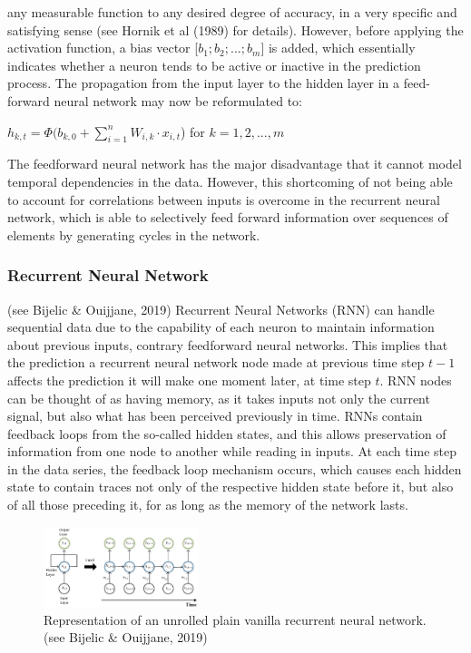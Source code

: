 \documentclass[a4paper,11pt,oneside]{book}
\begin{document}
any measurable function to any desired degree
of accuracy, in a very specific and satisfying
sense (see Hornik et al (1989) for details). However, before applying
the activation function, a bias vector [$b_{1};b_{2};...;b_{m}$] is added, which essentially
indicates whether a neuron tends to be active or inactive in the prediction process. The
propagation from the input layer to the hidden layer in a feed-forward neural
network may now be reformulated to:
 \begin{center}
	$h_{k,t} =\Phi(b_{k,0} +\sum_{i=1}^{n} W_{i,k} \cdot x_{i,t}$) for $k = 1,2,...,m$
\end{center}
The feedforward neural network has the major disadvantage that it cannot model temporal dependencies in the data. However, this shortcoming of not being able to account for correlations between inputs is overcome in the recurrent neural network, which is able to selectively feed forward information over sequences of elements by generating cycles in the network.
\subsubsection{Recurrent Neural Network} (see Bijelic \& Ouijjane, 2019)
Recurrent Neural Networks
(RNN) can handle sequential data due to the capability of each neuron to
maintain information about previous inputs, contrary feedforward neural networks. This implies that the prediction a recurrent
neural network node made at previous time step $t-1$ affects the prediction it will make one
moment later, at time step $t$. RNN nodes can be thought of as having memory, as it takes inputs not only the current signal, but also
what has been perceived previously in time.\newline\newline
RNNs contain feedback loops from the so-called hidden states, and this allows preservation of information from one node to another while reading in inputs. At each time step in the data series, the feedback loop mechanism occurs, which causes each hidden state to contain traces not only of the respective hidden state before it, but also of all those preceding it, for as long as the memory of the network lasts.\newline
\begin{figure}[h]
	\centering
	\includegraphics[width=0.4\textwidth]{figures/RNN}
	\caption{Representation of an unrolled plain vanilla recurrent neural network. (see Bijelic \& Ouijjane, 2019)}
	
	\label{seventhfig}
\end{figure}
\end{document}
